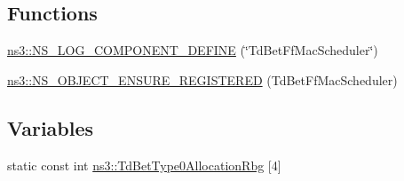 \subsection*{Functions}
\begin{DoxyCompactItemize}
\item 
\hyperlink{namespacens3_a798a0d9e6fbf1be600e5d7e1a1964206}{ns3\+::\+N\+S\+\_\+\+L\+O\+G\+\_\+\+C\+O\+M\+P\+O\+N\+E\+N\+T\+\_\+\+D\+E\+F\+I\+NE} (\char`\"{}Td\+Bet\+Ff\+Mac\+Scheduler\char`\"{})
\item 
\hyperlink{namespacens3_ae46a9ced2659e2a325204c72bff4cfdb}{ns3\+::\+N\+S\+\_\+\+O\+B\+J\+E\+C\+T\+\_\+\+E\+N\+S\+U\+R\+E\+\_\+\+R\+E\+G\+I\+S\+T\+E\+R\+ED} (Td\+Bet\+Ff\+Mac\+Scheduler)
\end{DoxyCompactItemize}
\subsection*{Variables}
\begin{DoxyCompactItemize}
\item 
static const int \hyperlink{namespacens3_a6d1b392f66cced03544c81adfbbe003d}{ns3\+::\+Td\+Bet\+Type0\+Allocation\+Rbg} \mbox{[}4\mbox{]}
\end{DoxyCompactItemize}
